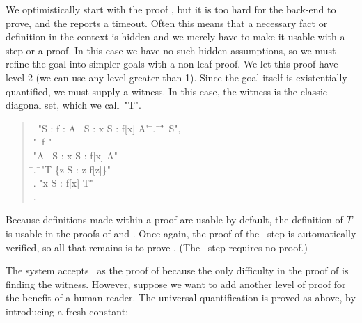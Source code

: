 \documentclass[a4paper]{easychair}
\begin{document}
We optimistically start with the proof \OBVIOUS, but it is too hard
for the back-end to prove, and the \PM reports a timeout.  Often this
means that a necessary fact or definition in the context is hidden and
we merely have to make it usable with a \USE step or a \BY proof.  In
this case we have no such hidden assumptions, so we must refine the
goal into simpler goals with a non-leaf proof.  We let this proof have
level 2 (we can use any level greater than 1).  Since the goal itself
is existentially quantified, we must supply a witness.  In this case,
the witness is the classic diagonal set, which we call~"T".
\begin{quote} \small
  \begin{tabbing}
    \THEOREM\ "\forall S : \forall f \in [S -> \SUBSET\ S] : \exists A \in \SUBSET\ S : \forall x \in S : f[x] \neq A" \kill
    \PROOF \kill
    \LSP \= .\ \= \ASSUME \= "\NEW\ S", \\
         \>        \>         \> "\NEW\ f \in [S -> \SUBSET\ S]" \\
         \>        \> \PROVE "\exists A \in \SUBSET\ S : \forall x \in S : f[x] \neq A" \\
         \>   \hspace{1em}     \= .\ \= \DEFINE "T \DEF \{z \in S : z \notin f[z]\}" \\
         \>        \> .  \> "\forall x \in S : f[x] \neq T" \\
         \>        \> .  \> \QED \BY {}
  \end{tabbing}
\end{quote}
Because definitions made within a proof are usable by default, the
definition of $T$ is usable in the proofs of  and .  Once
again, the proof of the \QED\ step is automatically verified, so all
that remains is to prove .  (The \DEFINE\ step requires no proof.)

The system accepts \OBVIOUS\ as the proof of  because the only
difficulty in the proof of  is finding the witness. However,
suppose we want to add another level of proof for the benefit of a
human reader.  The universal quantification is proved as above, by
introducing a fresh constant:
\end{document}
